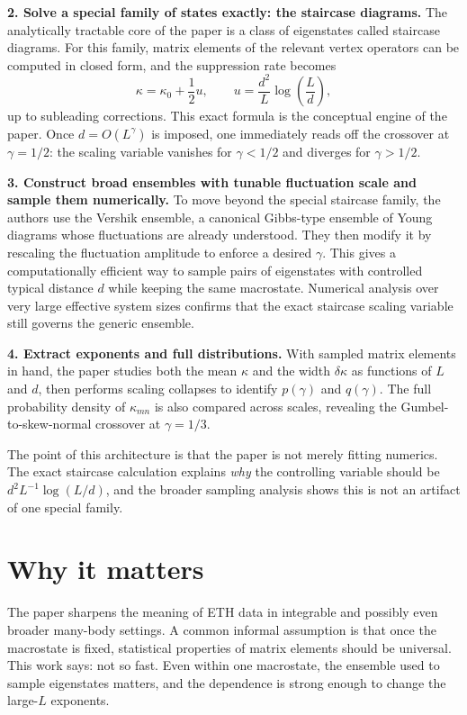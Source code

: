 \documentclass[11pt]{article}
\begin{document}
\textbf{2. Solve a special family of states exactly: the staircase diagrams.}
The analytically tractable core of the paper is a class of eigenstates called staircase diagrams. For this family, matrix elements of the relevant vertex operators can be computed in closed form, and the suppression rate becomes
\[
\kappa = \kappa_0 + \frac{1}{2}u,
\qquad
u = \frac{d^2}{L}\log\!\left(\frac{L}{d}\right),
\]
up to subleading corrections. This exact formula is the conceptual engine of the paper. Once $d=O(L^\gamma)$ is imposed, one immediately reads off the crossover at $\gamma=1/2$: the scaling variable vanishes for $\gamma<1/2$ and diverges for $\gamma>1/2$.

\textbf{3. Construct broad ensembles with tunable fluctuation scale and sample them numerically.}
To move beyond the special staircase family, the authors use the Vershik ensemble, a canonical Gibbs-type ensemble of Young diagrams whose fluctuations are already understood. They then modify it by rescaling the fluctuation amplitude to enforce a desired $\gamma$. This gives a computationally efficient way to sample pairs of eigenstates with controlled typical distance $d$ while keeping the same macrostate. Numerical analysis over very large effective system sizes confirms that the exact staircase scaling variable still governs the generic ensemble.

\textbf{4. Extract exponents and full distributions.}
With sampled matrix elements in hand, the paper studies both the mean $\kappa$ and the width $\delta\kappa$ as functions of $L$ and $d$, then performs scaling collapses to identify $p(\gamma)$ and $q(\gamma)$. The full probability density of $\kappa_{mn}$ is also compared across scales, revealing the Gumbel-to-skew-normal crossover at $\gamma=1/3$.

The point of this architecture is that the paper is not merely fitting numerics. The exact staircase calculation explains \emph{why} the controlling variable should be $d^2L^{-1}\log(L/d)$, and the broader sampling analysis shows this is not an artifact of one special family.

\section*{Why it matters}
The paper sharpens the meaning of ETH data in integrable and possibly even broader many-body settings. A common informal assumption is that once the macrostate is fixed, statistical properties of matrix elements should be universal. This work says: not so fast. Even within one macrostate, the ensemble used to sample eigenstates matters, and the dependence is strong enough to change the large-$L$ exponents.
\end{document}
